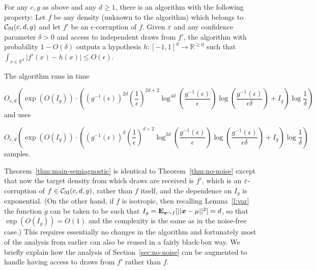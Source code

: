 \begin{theorem}  \label{thm:main-semiagnostic}
For any $c,g$ as above and any $d \geq 1$,  there is an algorithm with the following property:  Let $f$ be any density 
(unknown to the algorithm) which belongs to ${\mathcal C}_{\mathrm{SI}}(c,d,g)$ and let $f'$ be an $\epsilon$-corruption of $f$. 
Given $\varepsilon$ and any confidence parameter $\delta > 0$ and access to independent draws from $f'$, the algorithm with probability $1-O(\delta)$ outputs a hypothesis  ${h}:[-1,1]^d \rightarrow \mathbb{R}^{\geq 0}$ such that $\int_{x \in \mathbb{R}^d} |f'(x) - {h}(x)| \le O(\epsilon)$. 

The algorithm runs in time 
\[
O_{c,d}\left( 
 \exp(O(I_g)) \cdot
  \left(
   (g^{-1}(\epsilon))^{2d}
          \left( \frac{1}{\epsilon} \right)^{2 d + 2}
          \log^{4 d} \left( \frac{ g^{-1}(\epsilon)}{\epsilon} \right)
          \log \left( \frac{ g^{-1}(\epsilon)}{\epsilon \delta} \right) 
  + I_g \right) \log \frac{1}{\delta}
\right)
\] 
and uses 
\[
O_{c,d} \left(
 \exp(O(I_g)) \cdot
 \left(
 ( g^{-1}(\epsilon))^{d}
          \left( \frac{1}{\epsilon} \right)^{d+2}
          \log^{2d} \left( \frac{ g^{-1}(\epsilon)}{\epsilon} \right)
          \log \left( \frac{ g^{-1}(\epsilon)}{\epsilon \delta} \right)
 + I_g \right) \log \frac{1}{\delta}
  \right)
\] 
samples.  
\end{theorem}


Theorem~\ref{thm:main-semiagnostic} is identical to Theorem~\ref{thm:no-noise} except that now the target density from which draws are received is $f'$, which is an $\varepsilon$-corruption of $f \in {\mathcal C}_{\mathrm{SI}}(c,d,g)$, rather than $f$ itself,
and the dependence on $I_g$ is exponential.   
(On the other hand, if $f$ is isotropic,
then recalling Lemma~\ref{l:var} the function $g$ can be taken to be such that $I_g = \operatorname{{\bf E}}_{\boldsymbol{x} \sim f} [ || \boldsymbol{x} - \mu ||^2 ] = d$, so that 
$\exp(O(I_g)) = O(1)$ and the complexity is
the same as in the noise-free case.)
This requires essentially no changes in the algorithm and  fortunately most of the analysis from earlier can also be reused in a fairly black-box way. We briefly  explain how the analysis of Section~\ref{sec:no-noise} can be augmented to handle having access to draws from $f'$ rather than $f$. 


